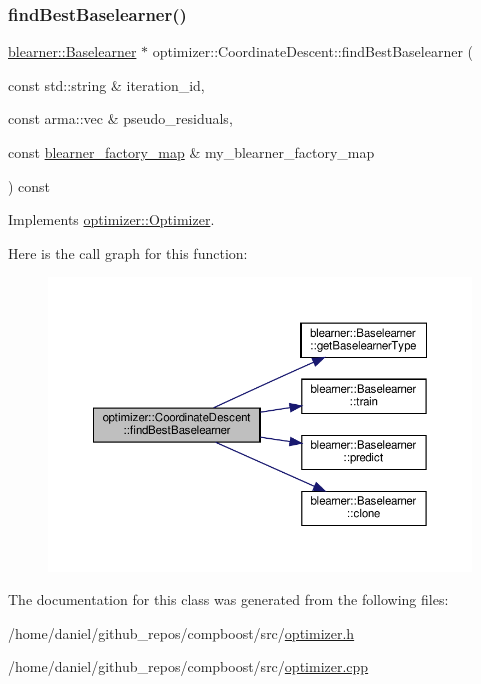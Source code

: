 \subsubsection{\texorpdfstring{find\+Best\+Baselearner()}{findBestBaselearner()}}
{\footnotesize\ttfamily \hyperlink{classblearner_1_1_baselearner}{blearner\+::\+Baselearner} $\ast$ optimizer\+::\+Coordinate\+Descent\+::find\+Best\+Baselearner (\begin{DoxyParamCaption}\item[{const std\+::string \&}]{iteration\+\_\+id,  }\item[{const arma\+::vec \&}]{pseudo\+\_\+residuals,  }\item[{const \hyperlink{baselearner__factory__list_8h_a058570e00ae11b882cfed36eb40be025}{blearner\+\_\+factory\+\_\+map} \&}]{my\+\_\+blearner\+\_\+factory\+\_\+map }\end{DoxyParamCaption}) const\hspace{0.3cm}{\ttfamily [virtual]}}



Implements \hyperlink{classoptimizer_1_1_optimizer_a134c7b34ed868231fbab53e9ebfa8fd8}{optimizer\+::\+Optimizer}.

Here is the call graph for this function\+:
\nopagebreak
\begin{figure}[H]
\begin{center}
\leavevmode
\includegraphics[width=350pt]{classoptimizer_1_1_coordinate_descent_af5e8a9fb18b1f627b20534b372d62a6e_cgraph}
\end{center}
\end{figure}


The documentation for this class was generated from the following files\+:\begin{DoxyCompactItemize}
\item 
/home/daniel/github\+\_\+repos/compboost/src/\hyperlink{optimizer_8h}{optimizer.\+h}\item 
/home/daniel/github\+\_\+repos/compboost/src/\hyperlink{optimizer_8cpp}{optimizer.\+cpp}\end{DoxyCompactItemize}
